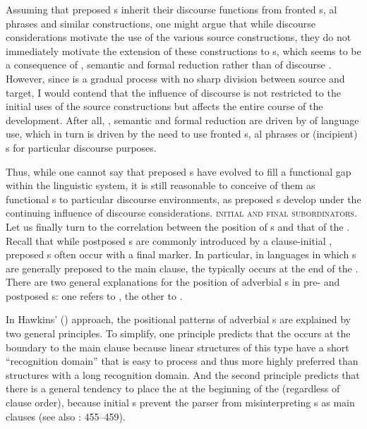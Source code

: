 \documentclass[output=paper]{langsci/langscibook}
\begin{document}
Assuming that preposed s inherit their discourse functions from fronted s, al phrases and similar constructions, one might argue that while discourse considerations motivate the use of the various source constructions, they do not immediately motivate the extension of these constructions to s, which 
\label{p:xxx:automatization}
seems to be a consequence of , semantic  and formal reduction rather than of discourse . However, since  is a gradual process with no sharp division between source and target, I would contend that the influence of discourse is not restricted to the initial uses of the source constructions but affects the entire course of the development. After all, , semantic  and formal reduction are driven by  of language use, which in turn is driven by the need to use fronted s, al phrases or (incipient) s for particular discourse purposes.

Thus, while one cannot say that preposed s have evolved to fill a functional gap within the linguistic system, it is still reasonable to conceive of them as functional s to particular discourse environments, as preposed s develop under the continuing influence of discourse considerations.
\newpage
\textsc{initial} \textsc{and} \textsc{final} \textsc{subordinators}. Let us finally turn to the correlation between the position of s and that of the . Recall that while postposed s are commonly introduced by a clause-initial , preposed s often occur with a final marker. In particular, in languages in which s are generally preposed to the main clause, the  typically occurs at the end of the . There are two general explanations for the position of adverbial s in pre- and postposed s: one refers to , the other to .

In Hawkins’ (\citeyear{Hawkins1994,Hawkins2004})  approach, the positional patterns of adverbial s are explained by two general principles. To simplify, one principle predicts that the  occurs at the boundary to the main clause because linear structures of this type have a short “recognition domain” that is easy to process and thus more highly preferred than structures with a long recognition domain. And the second principle predicts that there is a general tendency to place the  at the beginning of the  (regardless of clause order), because initial s prevent the parser from misinterpreting s as main clauses (see also \citealt{Diessel2005}: 455--459).
\end{document}
